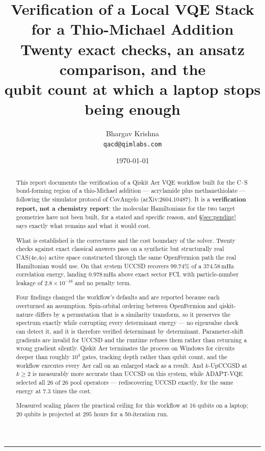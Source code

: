 \documentclass[11pt,a4paper]{article}
\title{\vspace{-1.1cm}\textbf{Verification of a Local VQE Stack\\
for a Thio-Michael Addition}\\[0.4em]
\large Twenty exact checks, an ansatz comparison, and the\\
qubit count at which a laptop stops being enough}
\author{Bhargav Krishna\\\small\texttt{qacd@qimlabs.com}}
\date{\today}
\newcommand{\mHa}{\ensuremath{\,\mathrm{mHa}}}
\begin{document}
\maketitle
\thispagestyle{fancy}

\begin{abstract}
\noindent
This report documents the verification of a Qiskit Aer VQE workflow built for
the C--S bond-forming region of a thio-Michael addition --- acrylamide plus
methanethiolate --- following the simulator protocol of CovAngelo
(arXiv:2604.10487). It is a \textbf{verification report, not a chemistry
report}: the molecular Hamiltonians for the two target geometries have not been
built, for a stated and specific reason, and \S\ref{sec:pending} says exactly
what remains and what it would cost.

What is established is the correctness and the cost boundary of the solver.
Twenty checks against exact classical answers pass on a synthetic but
structurally real CAS(4e,4o) active space constructed through the same
OpenFermion path the real Hamiltonian would use. On that system UCCSD recovers
$99.74\%$ of a $374.58\mHa$ correlation energy, landing $0.978\mHa$ above exact
sector FCI, with particle-number leakage of $2.8\times10^{-16}$ and no penalty
term.

Four findings changed the workflow's defaults and are reported because each
overturned an assumption. Spin-orbital ordering between OpenFermion and
qiskit-nature differs by a permutation that is a similarity transform, so it
preserves the spectrum exactly while corrupting every determinant energy --- no
eigenvalue check can detect it, and it is therefore verified determinant by
determinant. Parameter-shift gradients are invalid for UCCSD and the runtime
refuses them rather than returning a wrong gradient silently. Qiskit Aer
terminates the process on Windows for circuits deeper than roughly $10^4$ gates,
tracking depth rather than qubit count, and the workflow executes every Aer call
on an enlarged stack as a result. And $k$-UpCCGSD at $k \geq 2$ is measurably
more accurate than UCCSD on this system, while ADAPT-VQE selected all 26 of 26
pool operators --- rediscovering UCCSD exactly, for the same energy at $7.3$
times the cost.

Measured scaling places the practical ceiling for this workflow at 16 qubits on
a laptop; 20 qubits is projected at $295$ hours for a 50-iteration run.
\end{abstract}

\tableofcontents
\vspace{0.6em}
\hrule
\vspace{0.8em}
\end{document}
